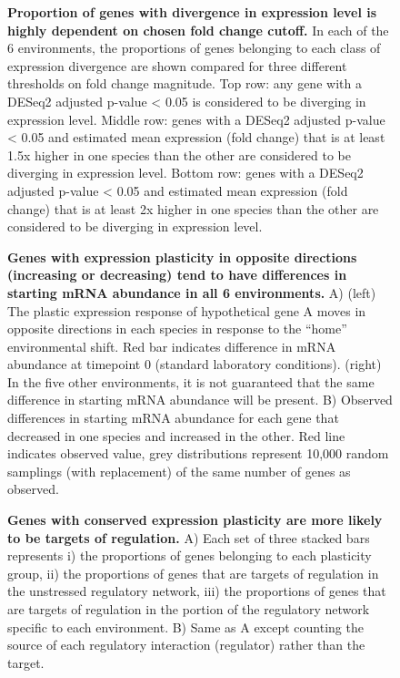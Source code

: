 \begin{figure}
    \centering
    \caption{\textbf{Proportion of genes with divergence in expression level is highly dependent on chosen fold change cutoff.} In each of the 6 environments, the proportions of genes belonging to each class of expression divergence are shown compared for three different thresholds on fold change magnitude. Top row: any gene with a DESeq2 adjusted p-value < 0.05 is considered to be diverging in expression level. Middle row: genes with a DESeq2 adjusted p-value < 0.05 and estimated mean expression (fold change) that is at least 1.5x higher in one species than the other are considered to be diverging in expression level. Bottom row: genes with a DESeq2 adjusted p-value < 0.05 and estimated mean expression (fold change) that is at least 2x higher in one species than the other are considered to be diverging in expression level.}
    \label{fig:threshold}
\end{figure}

\begin{figure}
    \centering
    \caption{\textbf{Genes with expression plasticity in opposite directions (increasing or decreasing) tend to have differences in starting mRNA abundance in all 6 environments.} A) (left) The plastic expression response of hypothetical gene A moves in opposite directions in each species in response to the “home” environmental shift. Red bar indicates difference in mRNA abundance at timepoint 0 (standard laboratory conditions). (right) In the five other environments, it is not guaranteed that the same difference in starting mRNA abundance will be present. B) Observed differences in starting mRNA abundance for each gene that decreased in one species and increased in the other. Red line indicates observed value, grey distributions represent 10,000 random samplings (with replacement) of the same number of genes as observed.}
    \label{fig:tp0}
\end{figure}

\begin{figure}
    \centering
    \caption{\textbf{Genes with conserved expression plasticity are more likely to be targets of regulation.} A) Each set of three stacked bars represents i) the proportions of genes belonging to each plasticity group, ii) the proportions of genes that are targets of regulation in the unstressed regulatory network, iii) the proportions of genes that are targets of regulation in the portion of the regulatory network specific to each environment. B) Same as A except counting the source of each regulatory interaction (regulator) rather than the target.}
    \label{fig:stackedbars}
\end{figure}


